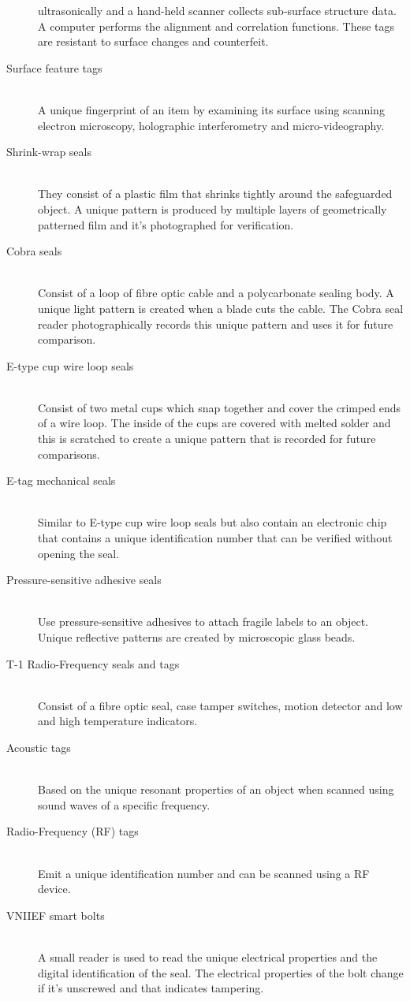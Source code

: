 \documentclass[twoside,titlepage,11pt,twocolumn,a4paper]{article}
\begin{document}
\begin{description}
    ultrasonically and a hand-held scanner collects sub-surface
    structure data. A computer performs the alignment and correlation
    functions. These tags are resistant to surface changes and
    counterfeit.
  \item[Surface feature tags] \hfill \\ A unique fingerprint of an
    item by examining its surface using scanning electron microscopy,
    holographic interferometry and micro-videography.
  \item[Shrink-wrap seals] \hfill \\ They consist of a plastic film
    that shrinks tightly around the safeguarded object. A unique
    pattern is produced by multiple layers of geometrically patterned
    film and it’s photographed for verification.
  \item[Cobra seals] \hfill \\ Consist of a loop of fibre optic cable
    and a polycarbonate sealing body. A unique light pattern is
    created when a blade cuts the cable. The Cobra seal reader
    photographically records this unique pattern and uses it for
    future comparison.
  \item[E-type cup wire loop seals] \hfill \\ Consist of two metal
    cups which snap together and cover the crimped ends of a wire
    loop. The inside of the cups are covered with melted solder and
    this is scratched to create a unique pattern that is recorded for
    future comparisons.
  \item[E-tag mechanical seals] \hfill \\ Similar to E-type cup wire
    loop seals but also contain an electronic chip that contains a
    unique identification number that can be verified without opening
    the seal.
  \item[Pressure-sensitive adhesive seals] \hfill \\ Use
    pressure-sensitive adhesives to attach fragile labels to an
    object. Unique reflective patterns are created by microscopic
    glass beads.
  \item[T-1 Radio-Frequency seals and tags] \hfill \\ Consist of a
    fibre optic seal, case tamper switches, motion detector and low
    and high temperature indicators.
  \item[Acoustic tags] \hfill \\ Based on the unique resonant
    properties of an object when scanned using sound waves of a
    specific frequency.
  \item[Radio-Frequency (RF) tags] \hfill \\ Emit a unique
    identification number and can be scanned using a RF device.
  \item[VNIIEF smart bolts] \hfill \\ A small reader is used to read
    the unique electrical properties and the digital identification of
    the seal. The electrical properties of the bolt change if it’s
    unscrewed and that indicates tampering.
\end{description}
\end{document}
